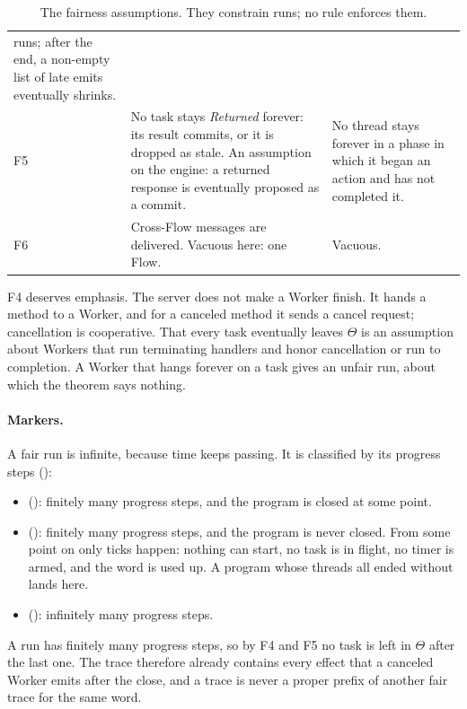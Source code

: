 \begin{table}[t]
\begin{tabularx}{\textwidth}{@{}P{0.6cm}LL@{}}
  runs; after the end, a non-empty list of late emits eventually
  shrinks. \\
F5 & No task stays \emph{Returned} forever: its result commits, or it is
  dropped as stale. An assumption on the engine: a returned response is
  eventually proposed as a commit. & No thread stays forever in a phase in
  which it began an action and has not completed it. \\
F6 & Cross-Flow messages are delivered. Vacuous here: one Flow. &
  Vacuous. \\
\bottomrule
\end{tabularx}
\caption{The fairness assumptions. They constrain runs; no rule enforces
them.}
\label{tab:fairness}
\end{table}

F4 deserves emphasis. The server does not make a Worker finish. It hands a
method to a Worker, and for a canceled method it sends a cancel request;
cancellation is cooperative. That every task eventually leaves $\Theta$ is
an assumption about Workers that run terminating handlers and honor
cancellation or run to completion. A Worker that hangs forever on a task
gives an unfair run, about which the theorem says nothing.

\paragraph{Markers.}
A fair run is infinite, because time keeps passing. It is classified by its
progress steps ():
\begin{itemize}
\item \mterm{} (): finitely many progress steps, and the
  program is closed at some point.
\item \mdead{} (): finitely many progress steps, and the
  program is never closed. From some point on only ticks happen: nothing
  can start, no task is in flight, no timer is armed, and the word is used
  up. A program whose threads all ended without  lands here.
\item \mdiv{} (): infinitely many progress steps.
\end{itemize}
A \mterm{} run has finitely many progress steps, so by F4 and F5 no task
is left in $\Theta$ after the last one. The trace therefore already contains
every effect that a canceled Worker emits after the close, and a \mterm{}
trace is never a proper prefix of another fair trace for the same word.

